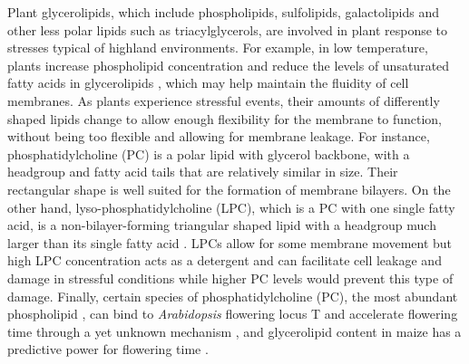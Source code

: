 \documentclass[9pt,twocolumn,twoside,lineno]{BioRxiv}
\begin{document}
Plant glycerolipids, which include phospholipids, sulfolipids, galactolipids and other less polar lipids such as triacylglycerols, are involved in plant response to stresses typical of highland environments.
For example, in low temperature, plants increase phospholipid concentration \cite{Degenkolbe2012-wf} and reduce the levels of unsaturated fatty acids in glycerolipids \cite{Welti2002-uk, Lynch1987-ln}, which may help maintain the fluidity of cell membranes.
As plants experience stressful events, their amounts of differently shaped lipids change to allow enough flexibility for the membrane to function, without being too flexible and allowing for membrane leakage. 
For instance, phosphatidylcholine (PC) is a polar lipid with glycerol backbone, with a headgroup and fatty acid tails that are relatively similar in size. Their rectangular shape is well suited for the formation of  membrane bilayers.
On the other hand, lyso-phosphatidylcholine (LPC), which is a PC with one single fatty acid, is a non-bilayer-forming triangular shaped lipid with a headgroup much larger than its single fatty acid \cite{Jouhet2013-fv}.
LPCs allow for some membrane movement but high LPC concentration acts as a detergent and can facilitate cell leakage and damage in stressful conditions while higher PC levels would prevent this type of damage.
Finally, certain species of phosphatidylcholine (PC), the most abundant phospholipid \cite{Gu2017-nd}, can bind to \textit{Arabidopsis} flowering locus T and accelerate flowering time through a yet unknown mechanism \cite{Nakamura2014-qf}, and glycerolipid content in maize has a  predictive power for flowering time \cite{Riedelsheimer2013-bd}. 
\end{document}
